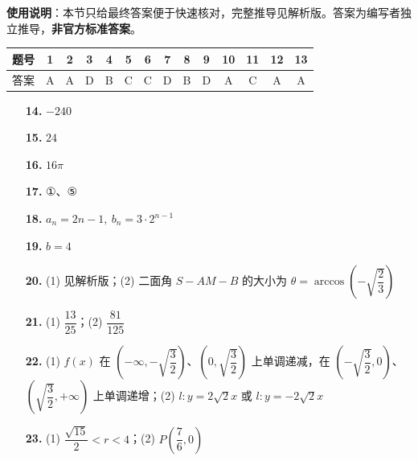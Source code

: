 
\begin{gknotice}
\textbf{使用说明}：本节只给最终答案便于快速核对，完整推导见解析版。答案为编写者独立推导，\textbf{非官方标准答案}。
\end{gknotice}

\begin{center}\begin{tabular}{cccccccccccccc}
\toprule
题号 & 1 & 2 & 3 & 4 & 5 & 6 & 7 & 8 & 9 & 10 & 11 & 12 & 13 \\
\midrule
答案 & A & A & D & B & C & C & D & B & D & A & C & A & A \\
\bottomrule
\end{tabular}\end{center}

\begin{itemize}[leftmargin=2.6em]
  \item[\textbf{14.}] $-240$
  \item[\textbf{15.}] $24$
  \item[\textbf{16.}] $16\pi$
  \item[\textbf{17.}] ①、⑤
\end{itemize}

\begin{itemize}[leftmargin=2.6em]
  \item[\textbf{18.}] $a_n=2n-1,\ b_n=3\cdot2^{n-1}$
  \item[\textbf{19.}] $b=4$
  \item[\textbf{20.}] (1) 见解析版；(2) 二面角 $S-AM-B$ 的大小为 $\theta=\arccos\left(-\sqrt{\dfrac23}\right)$
  \item[\textbf{21.}] (1) $\dfrac{13}{25}$；(2) $\dfrac{81}{125}$
  \item[\textbf{22.}] (1) $f(x)$ 在 $\left(-\infty,-\sqrt{\dfrac32}\right)$、$\left(0,\sqrt{\dfrac32}\right)$ 上单调递减，在 $\left(-\sqrt{\dfrac32},0\right)$、$\left(\sqrt{\dfrac32},+\infty\right)$ 上单调递增；(2) $l:y=2\sqrt2x$ 或 $l:y=-2\sqrt2x$
  \item[\textbf{23.}] (1) $\dfrac{\sqrt{15}}2<r<4$；(2) $P\left(\dfrac76,0\right)$
\end{itemize}

